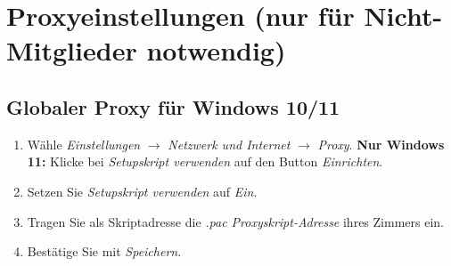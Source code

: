 \documentclass[a4paper,12pt]{scrartcl}
\begin{document}
\section{Proxyeinstellungen (nur für Nicht-Mitglieder notwendig)}
\label{proxy}

\subsection*{Globaler Proxy für Windows 10/11}
\begin{enumerate}
	\item Wähle \textit{Einstellungen} $\rightarrow$ \textit{Netzwerk und Internet} $\rightarrow$ \textit{Proxy}.
	\subitem \textbf{Nur Windows 11:} Klicke bei \textit{Setupskript verwenden} auf den Button  \textit{Einrichten}.
	
	\setcounter{enumi}{1}
	\item Setzen Sie \textit{Setupskript verwenden} auf \textit{Ein}.
	\item Tragen Sie als Skriptadresse die \textit{.pac Proxyskript-Adresse} ihres Zimmers ein.
	\item Bestätige Sie mit \textit{Speichern}.
\end{enumerate}
\end{document}
